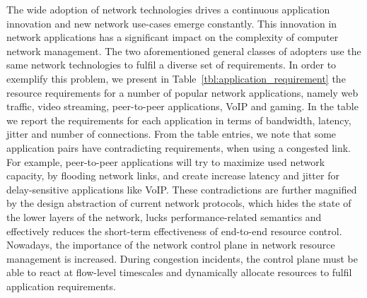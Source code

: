
The wide adoption of network technologies drives a continuous application
innovation and new network use-cases emerge constantly.  This innovation in
network applications has a significant impact on the complexity of computer
network management.  The two aforementioned general classes of adopters use the
same network technologies to fulfil a diverse set of requirements.  In order to
exemplify this problem, we present in Table~\ref{tbl:application_requirement}
the resource requirements for a number of popular network applications, namely
web traffic, video streaming, peer-to-peer applications,  VoIP and
gaming. In the table we report the requirements for each
application in terms of bandwidth, latency, jitter and number of connections.
From the table entries, we note that some application pairs have contradicting
requirements, when using a congested link.  For example, peer-to-peer
applications will try to maximize used network capacity, by flooding network
links, and create increase latency and jitter for delay-sensitive applications
like VoIP\@.  These contradictions are further magnified by the design
abstraction of current network protocols, which hides the state of the lower
layers of the network, lucks performance-related semantics and effectively
reduces the short-term effectiveness of end-to-end resource control.  Nowadays,
the importance of the network control plane in network resource management is
increased. During congestion incidents, the control plane must be able to react
at flow-level timescales and dynamically allocate resources to fulfil
application requirements. 


